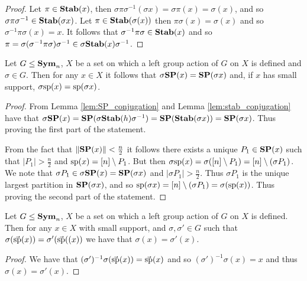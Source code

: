 \documentclass[../paper.tex]{subfiles}
\begin{document}
\begin{proof}
  Let $\pi \in \text{\textbf{Stab}}(x)$, then $\sigma \pi \sigma^{-1}(\sigma x) = \sigma \pi
  (x) = \sigma (x)$, and so $\sigma \pi \sigma^{-1} \in \text{\textbf{Stab}}(\sigma x)$. Let
  $\pi \in \text{\textbf{Stab}}(\sigma (x))$ then $\pi \sigma (x) = \sigma (x)$ and so
  $\sigma^{-1} \pi \sigma (x) = x$. It follows that $\sigma^{-1} \pi \sigma \in
  \text{\textbf{Stab}}(x)$ and so $\pi = \sigma (\sigma^{-1} \pi \sigma) \sigma ^{-1} \in
  \sigma \text{\textbf{Stab}}(x) \sigma^{-1}$.
\end{proof}

\begin{lem}
  \label{lem:support_mapping}
  Let $G \leq \text{\textbf{Sym}}_n$, $X$ be a set on which a left group action of $G$ on $X$
  is defined and $\sigma \in G$. Then for any $x \in X$ it follows that $\sigma
  \text{\textbf{SP}} (x) = \text{\textbf{SP}} (\sigma x)$ and, if $x$ has small support, $\sigma \text{sp} (x) =
  \text{sp} (\sigma x)$.
\end{lem}
\begin{proof}
  From Lemma \ref{lem:SP_conjugation} and Lemma \ref{lem:stab_conjugation} have
  that $\sigma \text{\textbf{SP}} (x) = \text{\textbf{SP}}(\sigma \text{\textbf{Stab}}(h) \sigma^{-1}) = \text{\textbf{SP}} (\text{\textbf{Stab}}(\sigma
  x)) = \text{\textbf{SP}} (\sigma x)$. Thus proving the first part of the statement.

  From the fact that $\| \text{\textbf{SP}}(x) \| < \frac{n}{2}$ it follows there exists a
  unique $P_1 \in \text{\textbf{SP}}(x)$ such that $\vert P_1 \vert > \frac{n}{2}$ and
  $\text{sp}(x) = [n] \setminus P_1$. But then $\sigma \text{sp} (x) = \sigma([n]
  \setminus P_1) = [n] \setminus (\sigma P_1)$. We note that $\sigma P_1 \in
  \sigma \text{\textbf{SP}} (x) = \text{\textbf{SP}}(\sigma x)$ and $\vert \sigma P_1 \vert > \frac{n}{2}$.
  Thus $\sigma P_1$ is the unique largest partition in $\text{\textbf{SP}}(\sigma x)$, and so
  $\text{sp}(\sigma x) = [n]\setminus (\sigma P_1) = \sigma (\text{sp}(x))$.
  Thus  proving the second part of the statement.
\end{proof}

\begin{lem}
  Let $G \leq \text{\textbf{Sym}}_n$, $X$ be a set on which a left group action of $G$ on $X$
  is defined.  Then for any $x \in X$ with small support, and $\sigma, \sigma'
  \in G$ such that $\sigma (\vec{\text{sp}}(x)) = \sigma' (\vec{\text{sp}}((x))$ we
  have that $\sigma (x) = \sigma'(x)$.
  \label{lem:support-determine-action}
\end{lem}
\begin{proof}
  We have that $(\sigma')^{-1}\sigma(\vec{\text{sp}}(x)) = \vec{\text{sp}}(x)$ and so
  $(\sigma')^{-1} \sigma (x) = x$ and thus $\sigma (x) = \sigma' (x)$.
\end{proof}
\end{document}

